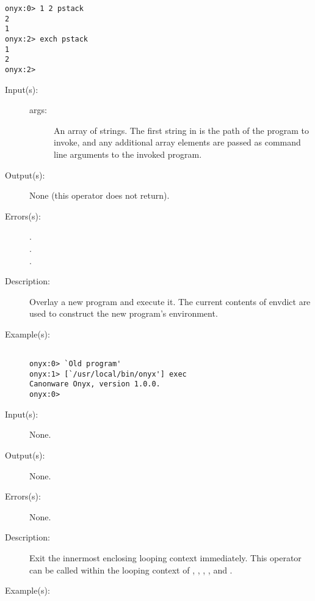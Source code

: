 \begin{description}
\begin{description}
\begin{verbatim}
onyx:0> 1 2 pstack
2
1
onyx:2> exch pstack
1
2
onyx:2>
		\end{verbatim}
	\end{description}
\label{systemdict:exec}
\item[{\onyxop{args}{exec}{--}}: ]
	\begin{description}\item[]
	\item[Input(s): ]
		\begin{description}\item[]
		\item[args: ]
			An array of strings.  The first string in 
			is the path of the program to invoke, and any additional
			array elements are passed as command line arguments to
			the invoked program.
		\end{description}
	\item[Output(s): ] None (this operator does not return).
	\item[Errors(s): ]
		\begin{description}\item[]
		\item[.]
		\item[.]
		\item[.]
		\end{description}
	\item[Description: ]
		Overlay a new program and execute it.  The current contents of
		envdict are used to construct the new program's environment.
	\item[Example(s): ]\begin{verbatim}

onyx:0> `Old program'
onyx:1> [`/usr/local/bin/onyx'] exec
Canonware Onyx, version 1.0.0.
onyx:0>
		\end{verbatim}
	\end{description}
\label{systemdict:exit}
\item[{\onyxop{--}{exit}{--}}: ]
	\begin{description}\item[]
	\item[Input(s): ] None.
	\item[Output(s): ] None.
	\item[Errors(s): ] None.
	\item[Description: ]
		Exit the innermost enclosing looping context immediately.
		This operator can be called within the looping context of
		,
		,
		,
		, and
		.
	\item[Example(s): ]\begin{verbatim}


\end{verbatim}
\end{description}
\end{description}
